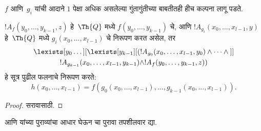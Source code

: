 \documentclass[../../../include/open-logic-section]{subfiles}
\begin{document}
$f$ आणि~$g_i$ यांची आदाने $1$ पेक्षा अधिक असलेल्या गुंतागुंतीच्या
बाबतीतही हीच कल्पना लागू पडते.

\begin{prop}
$!A_f(y_0, \dots, y_{k-1}, z)$ हे~$\Th{Q}$ मध्ये
$f(y_0, \dots, y_{k-1})$ चे, आणि
$!A_{g_i}(x_0, \dots, x_{l-1}, y)$ हे~$\Th{Q}$ मध्ये
$g_i(x_0, \dots, x_{l-1})$ चे निरूपण करत असेल, तर
\begin{multline*}
  \lexists[y_0\dots][\lexists[y_{k-1}][(!A_{g_0}(x_0,\dots,x_{l-1},y_0) \land
      \dots \land {}]]\\
  !A_{g_{k-1}}(x_0,\dots,x_{l-1},y_{k-1}) \land !A_f(y_0,\dots,y_{k-1},z))
\end{multline*}
हे सूत्र पुढील फलनाचे निरूपण करते:
\[
h(x_0, \dots, x_{l-1}) = f(g_0(x_0, \dots, x_{l-1}), \dots, g_{k-1}(x_0,
\dots, x_{l-1})).
\]
\end{prop}

\begin{proof}
सरावासाठी.
\end{proof}

\begin{prob}
 आणि
 यांच्या पुराव्यांचा आधार घेऊन
 चा पुरावा तपशीलवार द्या.
\end{prob}
\end{document}
